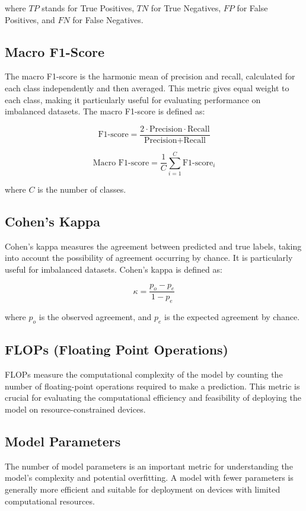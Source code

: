 where \(TP\) stands for True Positives, \(TN\) for True Negatives, \(FP\) for False Positives, and \(FN\) for False Negatives.

\subsection{Macro F1-Score}
\hspace{2em}The macro F1-score is the harmonic mean of precision and recall, calculated for each class independently and then averaged. This metric gives equal weight to each class, making it particularly useful for evaluating performance on imbalanced datasets. The macro F1-score is defined as:

\[
\text{F1-score} = \frac{2 \cdot \text{Precision} \cdot \text{Recall}}{\text{Precision} + \text{Recall}}
\]

\[
\text{Macro F1-score} = \frac{1}{C} \sum_{i=1}^{C} \text{F1-score}_i
\]

where \(C\) is the number of classes.

\subsection{Cohen's Kappa}
\hspace{2em}Cohen's kappa measures the agreement between predicted and true labels, taking into account the possibility of agreement occurring by chance. It is particularly useful for imbalanced datasets. Cohen's kappa is defined as:

\[
\kappa = \frac{p_o - p_e}{1 - p_e}
\]

where \(p_o\) is the observed agreement, and \(p_e\) is the expected agreement by chance.

\subsection{FLOPs (Floating Point Operations)}

\hspace{2em}FLOPs measure the computational complexity of the model by counting the number of floating-point operations required to make a prediction. This metric is crucial for evaluating the computational efficiency and feasibility of deploying the model on resource-constrained devices.

\subsection{Model Parameters}
\hspace{2em}The number of model parameters is an important metric for understanding the model's complexity and potential overfitting. A model with fewer parameters is generally more efficient and suitable for deployment on devices with limited computational resources.

